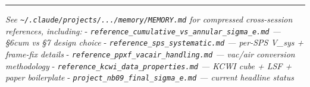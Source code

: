 \documentclass[
  10pt,
]{article}
\begin{document}
\begin{center}\rule{0.5\linewidth}{0.5pt}\end{center}

\emph{See \texttt{\textasciitilde{}/.claude/projects/.../memory/MEMORY.md} for compressed cross-session references, including:} - \emph{\texttt{reference\_cumulative\_vs\_annular\_sigma\_e.md} ---
§6cum vs §7 design choice} - \emph{\texttt{reference\_sps\_systematic.md} --- per-SPS V\_sys + frame-fix details} - \emph{\texttt{reference\_ppxf\_vacair\_handling.md} --- vac/air conversion
methodology} - \emph{\texttt{reference\_kcwi\_data\_properties.md} --- KCWI cube + LSF + paper boilerplate} - \emph{\texttt{project\_nb09\_final\_sigma\_e.md} --- current headline status}
\end{document}
